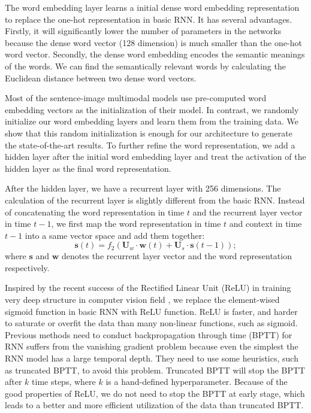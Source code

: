 The word embedding layer learns a initial dense word embedding representation to replace the one-hot representation in basic RNN.
It has several advantages.
Firstly, it will significantly lower the number of parameters in the networks because the dense word vector (128 dimension) is much smaller than the one-hot word vector.
Secondly, the dense word embedding encodes the semantic meanings of the words.
We can find the semantically relevant words by calculating the Euclidean distance between two dense word vectors.

Most of the sentence-image multimodal models \cite{karpathy2014fragment,frome2013devise,socher2014grounded,kiros2013multimodal} use pre-computed word embedding vectors as the initialization of their model. 
In contrast, we randomly initialize our word embedding layers and learn them from the training data.
We show that this random initialization is enough for our architecture to generate the state-of-the-art results.
To further refine the word representation, we add a hidden layer after the initial word embedding layer and treat the activation of the hidden layer as the final word representation.

After the hidden layer, we have a recurrent layer with 256 dimensions.
The calculation of the recurrent layer is slightly different from the basic RNN.
Instead of concatenating the word representation in time $t$ and the recurrent layer vector in time $t-1$, we first map the word representation in time $t$ and context in time $t-1$ into a same vector space and add them together:
\begin{equation}
\mathbf{s}(t)=f_2(\mathbf{U}_w \cdot \mathbf{w}(t) + \mathbf{U}_s \cdot \mathbf{s}(t-1));
\end{equation}
where $\mathbf{s}$ and $\mathbf{w}$ denotes the recurrent layer vector and the word representation respectively.

Inspired by the recent success of the Rectified Linear Unit (ReLU) in training very deep structure in computer vision field \cite{krizhevsky2012imagenet}, we replace the element-wised sigmoid function in basic RNN with ReLU function.
ReLU is faster, and harder to saturate or overfit the data than many non-linear functions, such as sigmoid.
Previous methods \cite{mikolov2010recurrent,mikolov2011extensions} need to conduct backpropagation through time (BPTT) \cite{rumelhart1988learning} for RNN suffers from the vanishing gradient problem because even the simplest the RNN model has a large temporal depth.
They need to use some heuristics, such as truncated BPTT, to avoid this problem.
Truncated BPTT will stop the BPTT after $k$ time steps, where $k$ is a hand-defined hyperparameter.
Because of the good properties of ReLU, we do not need to stop the BPTT at early stage, which leads to a better and more efficient utilization of the data than truncated BPTT.

